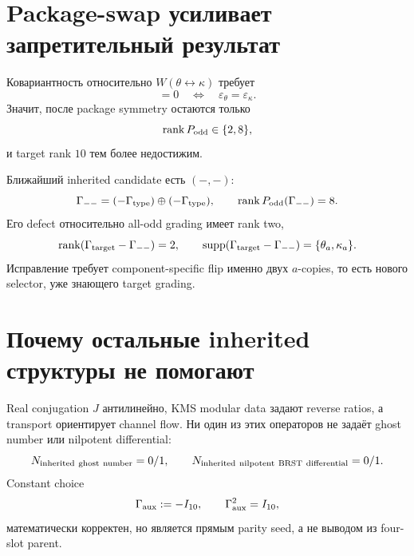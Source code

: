 \section{Package-swap усиливает запретительный результат}

Ковариантность относительно $W(\theta\leftrightarrow\kappa)$ требует
\begin{equation}
 [W,\Gamma(\varepsilon_\theta,\varepsilon_\kappa)]=0
 \quad\Longleftrightarrow\quad
 \varepsilon_\theta=\varepsilon_\kappa.
 \label{eq:v9-kms-aux-statistics-swap-condition}
\end{equation}
Значит, после package symmetry остаются только
\begin{equation}
 \operatorname{rank} P_{\rm odd}\in\{2,8\},
 \label{eq:v9-kms-aux-statistics-swap-ranks}
\end{equation}
и target rank $10$ тем более недостижим.

Ближайший inherited candidate есть $(-,-)$:
\begin{equation}
 \Gamma_{--}=(-\Gamma_{\rm type})\oplus(-\Gamma_{\rm type}),
 \qquad \operatorname{rank} P_{\rm odd}(\Gamma_{--})=8.
 \label{eq:v9-kms-aux-statistics-closest}
\end{equation}
Его defect относительно all-odd grading имеет rank two,
\begin{equation}
 \operatorname{rank}(\Gamma_{\rm target}-\Gamma_{--})=2,
 \qquad
 \operatorname{supp}(\Gamma_{\rm target}-\Gamma_{--})
 =\{\theta_a,\kappa_a\}.
 \label{eq:v9-kms-aux-statistics-defect}
\end{equation}
Исправление требует component-specific flip именно двух $a$-copies, то
есть нового selector, уже знающего target grading.

\section{Почему остальные inherited структуры не помогают}

Real conjugation $J$ антилинейно, KMS modular data задают reverse ratios,
а transport ориентирует channel flow. Ни один из этих операторов не задаёт
ghost number или nilpotent differential:
\begin{equation}
 N_{\rm inherited\ ghost\ number}=0/1,
 \qquad
 N_{\rm inherited\ nilpotent\ BRST\ differential}=0/1.
 \label{eq:v9-kms-aux-statistics-brst-absence}
\end{equation}
Constant choice
\begin{equation}
 \Gamma_{\rm aux}:=-I_{10},
 \qquad \Gamma_{\rm aux}^2=I_{10},
 \label{eq:v9-kms-aux-statistics-conditional-seed}
\end{equation}
математически корректен, но является прямым parity seed, а не выводом из
four-slot parent.

